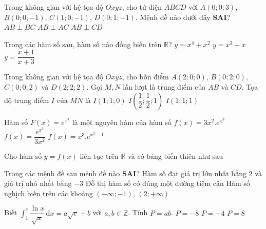 \begin{ex}%
Trong không gian với hệ tọa độ $Oxyz$, cho tứ diện $ABCD$ với $A(0;0;3)$, $B(0;0;-1)$, $C(1;0;-1)$, $D(0;1;-1)$. Mệnh đề nào dưới đây \textbf{SAI}?
{$AB\perp BC$}
{\True $AB\perp AC$}
{$AB\perp CD$}
\end{ex}

\begin{ex}%
Trong các hàm số sau, hàm số nào đồng biến trên $\mathbb{R}$?
{$y=x^4+x^2$}
{\True $y=x^3+x$}
{$y=\dfrac{x+1}{x+3}$}
\end{ex}

\begin{ex}%
Trong không gian với hệ tọa độ $Oxyz$, cho bốn điểm $A(2;0;0)$, $B(0;2;0)$, $C(0;0;2)$ và $D(2;2;2)$. Gọi $M,N$ lần lượt là trung điểm của $AB$ và $CD$. Tọa độ trung điểm $I$ của $MN$ là
{$I(1;1;0)$}
{$I\left(\dfrac{1}{2};\dfrac{1}{2};1\right)$}
{\True $I(1;1;1)$}
\end{ex}

\begin{ex}%
Hàm số $F(x)=e^{x^3}$ là một nguyên hàm của hàm số
{\True $f(x)=3x^2.e^{x^3}$}
{$f(x)=\dfrac{e^{x^3}}{3x^2}$}
{$f(x)=x^3.e^{x^3-1}$}
\end{ex}

\begin{ex}%
Cho hàm số $y=f(x)$ liên tục trên $\mathbb{R}$ và có bảng biến thiên như sau
\begin{center}
\end{center}
Trong các mệnh đề sau mệnh đề nào \textbf{SAI}?
{\True Hàm số đạt giá trị lớn nhất bằng $2$ và giá trị nhỏ nhất bằng $-3$}
{Đồ thị hàm số có đúng một đường tiệm cận}
{Hàm số nghịch biến trên các khoảng $(-\infty;-1)$, $(2;+\infty)$}
\end{ex}

\begin{ex}%
Biết $\displaystyle\int_1^e \dfrac{\ln x}{\sqrt{x}}\mathrm{\, d}x=a\sqrt{e}+b$ với $a,b\in\mathbb{Z}$. Tính $P=ab$.
{\True $P=-8$}
{$P=-4$}
{$P=8$}
\end{ex}

